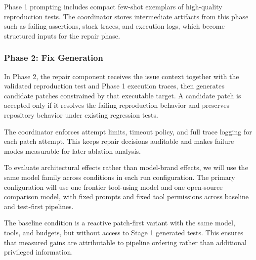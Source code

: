 \documentclass[12pt]{article}
\begin{document}
Phase 1 prompting includes compact few-shot exemplars of high-quality reproduction tests. The coordinator stores intermediate artifacts from this phase such as failing assertions, stack traces, and execution logs, which become structured inputs for the repair phase.



\subsubsection{Phase 2: Fix Generation}

In Phase 2, the repair component receives the issue context together with the validated reproduction test and Phase 1 execution traces, then generates candidate patches constrained by that executable target. A candidate patch is accepted only if it resolves the failing reproduction behavior and preserves repository behavior under existing regression tests.

The coordinator enforces attempt limits, timeout policy, and full trace logging for each patch attempt. This keeps repair decisions auditable and makes failure modes measurable for later ablation analysis.

To evaluate architectural effects rather than model-brand effects, we will use the same model family across conditions in each run configuration. The primary configuration will use one frontier tool-using model and one open-source comparison model, with fixed prompts and fixed tool permissions across baseline and test-first pipelines.

The baseline condition is a reactive patch-first variant with the same model, tools, and budgets, but without access to Stage 1 generated tests. This ensures that measured gains are attributable to pipeline ordering rather than additional privileged information.

\end{document}
